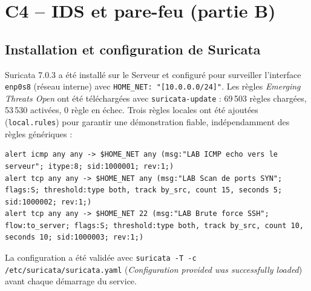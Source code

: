\documentclass[11pt,a4paper]{article}
\begin{document}
\section{C4 -- IDS et pare-feu (partie B)}

\subsection{Installation et configuration de Suricata}
Suricata 7.0.3 a été installé sur le Serveur et configuré pour surveiller l'interface
\texttt{enp0s8} (réseau interne) avec \texttt{HOME\_NET: "[10.0.0.0/24]"}. Les règles
\emph{Emerging Threats Open} ont été téléchargées avec \texttt{suricata-update} : 69\,503 règles
chargées, 53\,530 activées, 0 règle en échec. Trois règles locales ont été ajoutées
(\texttt{local.rules}) pour garantir une démonstration fiable, indépendamment des règles génériques :

\begin{lstlisting}
alert icmp any any -> $HOME_NET any (msg:"LAB ICMP echo vers le serveur"; itype:8; sid:1000001; rev:1;)
alert tcp any any -> $HOME_NET any (msg:"LAB Scan de ports SYN"; flags:S; threshold:type both, track by_src, count 15, seconds 5; sid:1000002; rev:1;)
alert tcp any any -> $HOME_NET 22 (msg:"LAB Brute force SSH"; flow:to_server; flags:S; threshold:type both, track by_src, count 10, seconds 10; sid:1000003; rev:1;)
\end{lstlisting}

La configuration a été validée avec \texttt{suricata -T -c /etc/suricata/suricata.yaml}
(\emph{Configuration provided was successfully loaded}) avant chaque démarrage du service.
\end{document}
